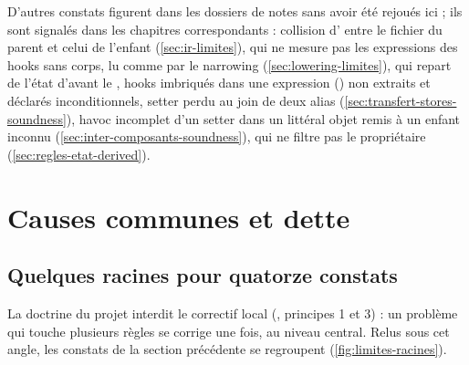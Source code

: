 D'autres constats figurent dans les dossiers de notes sans avoir été rejoués ici ; ils sont signalés dans les chapitres correspondants : collision d' entre le fichier du parent et celui de l'enfant (\cref{sec:ir-limites}),  qui ne mesure pas les expressions des hooks sans corps,  lu comme \code{||} par le narrowing (\cref{sec:lowering-limites}),  qui repart de l'état d'avant le , hooks imbriqués dans une expression () non extraits et déclarés inconditionnels, setter perdu au join de deux alias (\cref{sec:transfert-stores-soundness}), havoc incomplet d'un setter dans un littéral objet remis à un enfant inconnu (\cref{sec:inter-composants-soundness}),  qui ne filtre pas le propriétaire (\cref{sec:regles-etat-derived}).

\section{Causes communes et dette}
\label{sec:limites-perspectives-dette}

\subsection{Quelques racines pour quatorze constats}
\label{sec:limites-perspectives-racines}

La doctrine du projet interdit le correctif local (, principes 1 et 3) : un problème qui touche plusieurs règles se corrige une fois, au niveau central. Relus sous cet angle, les constats de la section précédente se regroupent (\cref{fig:limites-racines}).

